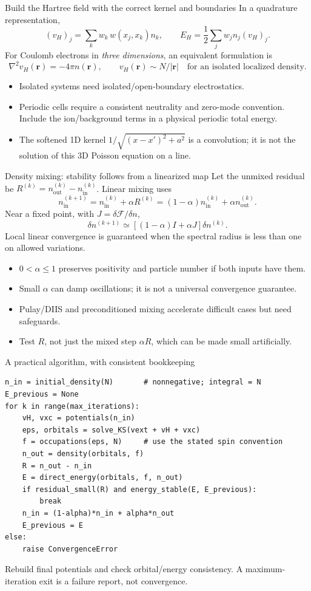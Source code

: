 \documentclass[aspectratio=169,10pt]{beamer}
\newcommand{\rr}{\mathbf r}
\newcommand{\inp}{\mathrm{in}}
\newcommand{\out}{\mathrm{out}}
\begin{document}
\begin{frame}{Build the Hartree field with the correct kernel and boundaries}
In a quadrature representation,
\[
 (v_H)_j=\sum_k w_k\,w(x_j,x_k)n_k,\qquad
 E_H=\frac12\sum_j w_j n_j(v_H)_j.
\]
For Coulomb electrons in \emph{three dimensions}, an equivalent formulation is
\[
 \nabla^2v_H(\rr)=-4\pi n(\rr),\qquad
 v_H(\rr)\sim N/|\rr|\quad\text{for an isolated localized density}.
\]
\begin{itemize}
\item Isolated systems need isolated/open-boundary electrostatics.
\item Periodic cells require a consistent neutrality and zero-mode convention.
Include the ion/background terms in a physical periodic total energy.
\item The softened 1D kernel $1/\sqrt{(x-x')^2+a^2}$ is a convolution;
it is not the solution of this 3D Poisson equation on a line.
\end{itemize}
\end{frame}

\begin{frame}{Density mixing: stability follows from a linearized map}
Let the unmixed residual be $R^{(k)}=n_{\out}^{(k)}-n_{\inp}^{(k)}$.
Linear mixing uses
\[
 n_{\inp}^{(k+1)}=n_{\inp}^{(k)}+\alpha R^{(k)}
                  =(1-\alpha)n_{\inp}^{(k)}+\alpha n_{\out}^{(k)}.
\]
Near a fixed point, with $J=\delta\mathcal F/\delta n$,
\[
 \delta n^{(k+1)}\simeq[(1-\alpha)I+\alpha J]\delta n^{(k)}.
\]
Local linear convergence is guaranteed when the spectral radius is less than
one on allowed variations.
\begin{itemize}
\item $0<\alpha\leq1$ preserves positivity and particle number if both inputs have them.
\item Small $\alpha$ can damp oscillations; it is not a universal convergence guarantee.
\item Pulay/DIIS and preconditioned mixing accelerate difficult cases but need safeguards.
\item Test $R$, not just the mixed step $\alpha R$, which can be made small artificially.
\end{itemize}
\end{frame}

\begin{frame}[fragile]{A practical algorithm, with consistent bookkeeping}
\begin{lstlisting}
n_in = initial_density(N)       # nonnegative; integral = N
E_previous = None
for k in range(max_iterations):
    vH, vxc = potentials(n_in)
    eps, orbitals = solve_KS(vext + vH + vxc)
    f = occupations(eps, N)     # use the stated spin convention
    n_out = density(orbitals, f)
    R = n_out - n_in
    E = direct_energy(orbitals, f, n_out)
    if residual_small(R) and energy_stable(E, E_previous):
        break
    n_in = (1-alpha)*n_in + alpha*n_out
    E_previous = E
else:
    raise ConvergenceError
\end{lstlisting}
\small Rebuild final potentials and check orbital/energy consistency.
A maximum-iteration exit is a failure report, not convergence.
\end{frame}
\end{document}
